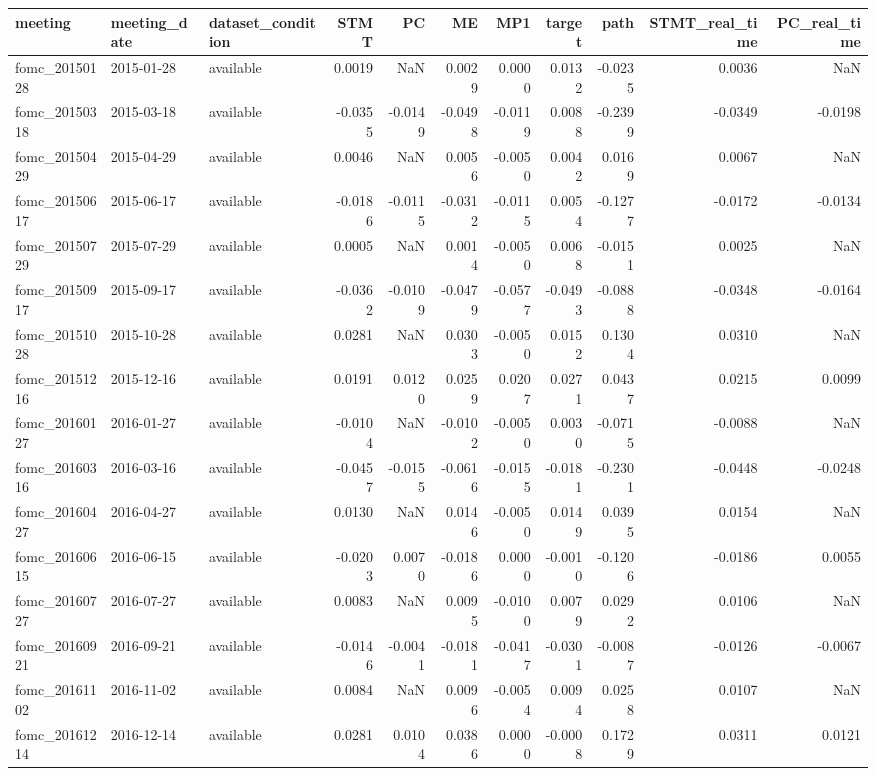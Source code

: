 \begin{tabular}{lllrrrrrrrr}
\toprule
meeting & meeting_date & dataset_condition & STMT & PC & ME & MP1 & target & path & STMT_real_time & PC_real_time \\
\midrule
fomc_20150128 & 2015-01-28 & available & 0.0019 & NaN & 0.0029 & 0.0000 & 0.0132 & -0.0235 & 0.0036 & NaN \\
fomc_20150318 & 2015-03-18 & available & -0.0355 & -0.0149 & -0.0498 & -0.0119 & 0.0088 & -0.2399 & -0.0349 & -0.0198 \\
fomc_20150429 & 2015-04-29 & available & 0.0046 & NaN & 0.0056 & -0.0050 & 0.0042 & 0.0169 & 0.0067 & NaN \\
fomc_20150617 & 2015-06-17 & available & -0.0186 & -0.0115 & -0.0312 & -0.0115 & 0.0054 & -0.1277 & -0.0172 & -0.0134 \\
fomc_20150729 & 2015-07-29 & available & 0.0005 & NaN & 0.0014 & -0.0050 & 0.0068 & -0.0151 & 0.0025 & NaN \\
fomc_20150917 & 2015-09-17 & available & -0.0362 & -0.0109 & -0.0479 & -0.0577 & -0.0493 & -0.0888 & -0.0348 & -0.0164 \\
fomc_20151028 & 2015-10-28 & available & 0.0281 & NaN & 0.0303 & -0.0050 & 0.0152 & 0.1304 & 0.0310 & NaN \\
fomc_20151216 & 2015-12-16 & available & 0.0191 & 0.0120 & 0.0259 & 0.0207 & 0.0271 & 0.0437 & 0.0215 & 0.0099 \\
fomc_20160127 & 2016-01-27 & available & -0.0104 & NaN & -0.0102 & -0.0050 & 0.0030 & -0.0715 & -0.0088 & NaN \\
fomc_20160316 & 2016-03-16 & available & -0.0457 & -0.0155 & -0.0616 & -0.0155 & -0.0181 & -0.2301 & -0.0448 & -0.0248 \\
fomc_20160427 & 2016-04-27 & available & 0.0130 & NaN & 0.0146 & -0.0050 & 0.0149 & 0.0395 & 0.0154 & NaN \\
fomc_20160615 & 2016-06-15 & available & -0.0203 & 0.0070 & -0.0186 & 0.0000 & -0.0010 & -0.1206 & -0.0186 & 0.0055 \\
fomc_20160727 & 2016-07-27 & available & 0.0083 & NaN & 0.0095 & -0.0100 & 0.0079 & 0.0292 & 0.0106 & NaN \\
fomc_20160921 & 2016-09-21 & available & -0.0146 & -0.0041 & -0.0181 & -0.0417 & -0.0301 & -0.0087 & -0.0126 & -0.0067 \\
fomc_20161102 & 2016-11-02 & available & 0.0084 & NaN & 0.0096 & -0.0054 & 0.0094 & 0.0258 & 0.0107 & NaN \\
fomc_20161214 & 2016-12-14 & available & 0.0281 & 0.0104 & 0.0386 & 0.0000 & -0.0008 & 0.1729 & 0.0311 & 0.0121 \\

\end{tabular}
